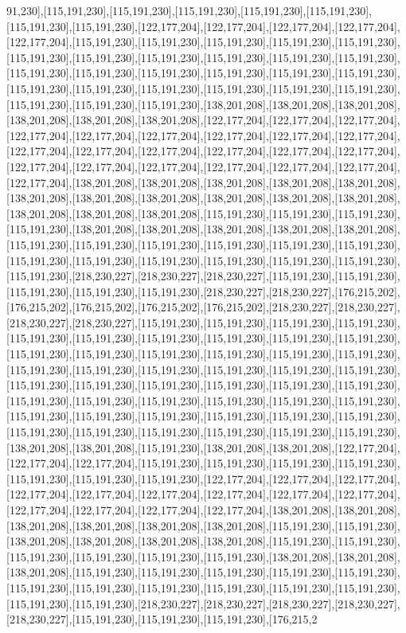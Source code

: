 91,230],[115,191,230],[115,191,230],[115,191,230],[115,191,230],[115,191,230],[115,191,230],[115,191,230],[122,177,204],[122,177,204],[122,177,204],[122,177,204],[122,177,204],[115,191,230],[115,191,230],[115,191,230],[115,191,230],[115,191,230],[115,191,230],[115,191,230],[115,191,230],[115,191,230],[115,191,230],[115,191,230],[115,191,230],[115,191,230],[115,191,230],[115,191,230],[115,191,230],[115,191,230],[115,191,230],[115,191,230],[115,191,230],[115,191,230],[115,191,230],[115,191,230],[115,191,230],[115,191,230],[115,191,230],[138,201,208],[138,201,208],[138,201,208],[138,201,208],[138,201,208],[138,201,208],[122,177,204],[122,177,204],[122,177,204],[122,177,204],[122,177,204],[122,177,204],[122,177,204],[122,177,204],[122,177,204],[122,177,204],[122,177,204],[122,177,204],[122,177,204],[122,177,204],[122,177,204],[122,177,204],[122,177,204],[122,177,204],[122,177,204],[122,177,204],[122,177,204],[122,177,204],[138,201,208],[138,201,208],[138,201,208],[138,201,208],[138,201,208],[138,201,208],[138,201,208],[138,201,208],[138,201,208],[138,201,208],[138,201,208],[138,201,208],[138,201,208],[138,201,208],[115,191,230],[115,191,230],[115,191,230],[115,191,230],[138,201,208],[138,201,208],[138,201,208],[138,201,208],[138,201,208],[115,191,230],[115,191,230],[115,191,230],[115,191,230],[115,191,230],[115,191,230],[115,191,230],[115,191,230],[115,191,230],[115,191,230],[115,191,230],[115,191,230],[115,191,230],[218,230,227],[218,230,227],[218,230,227],[115,191,230],[115,191,230],[115,191,230],[115,191,230],[115,191,230],[218,230,227],[218,230,227],[176,215,202],[176,215,202],[176,215,202],[176,215,202],[176,215,202],[218,230,227],[218,230,227],[218,230,227],[218,230,227],[115,191,230],[115,191,230],[115,191,230],[115,191,230],[115,191,230],[115,191,230],[115,191,230],[115,191,230],[115,191,230],[115,191,230],[115,191,230],[115,191,230],[115,191,230],[115,191,230],[115,191,230],[115,191,230],[115,191,230],[115,191,230],[115,191,230],[115,191,230],[115,191,230],[115,191,230],[115,191,230],[115,191,230],[115,191,230],[115,191,230],[115,191,230],[115,191,230],[115,191,230],[115,191,230],[115,191,230],[115,191,230],[115,191,230],[115,191,230],[115,191,230],[115,191,230],[115,191,230],[115,191,230],[115,191,230],[115,191,230],[115,191,230],[115,191,230],[115,191,230],[115,191,230],[115,191,230],[115,191,230],[138,201,208],[138,201,208],[115,191,230],[138,201,208],[138,201,208],[122,177,204],[122,177,204],[122,177,204],[115,191,230],[115,191,230],[115,191,230],[115,191,230],[115,191,230],[115,191,230],[115,191,230],[122,177,204],[122,177,204],[122,177,204],[122,177,204],[122,177,204],[122,177,204],[122,177,204],[122,177,204],[122,177,204],[122,177,204],[122,177,204],[122,177,204],[122,177,204],[138,201,208],[138,201,208],[138,201,208],[138,201,208],[138,201,208],[138,201,208],[115,191,230],[115,191,230],[138,201,208],[138,201,208],[138,201,208],[138,201,208],[115,191,230],[115,191,230],[115,191,230],[115,191,230],[115,191,230],[115,191,230],[138,201,208],[138,201,208],[138,201,208],[115,191,230],[115,191,230],[115,191,230],[115,191,230],[115,191,230],[115,191,230],[115,191,230],[115,191,230],[115,191,230],[115,191,230],[115,191,230],[115,191,230],[115,191,230],[218,230,227],[218,230,227],[218,230,227],[218,230,227],[218,230,227],[115,191,230],[115,191,230],[115,191,230],[176,215,2